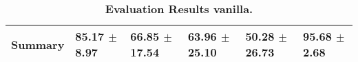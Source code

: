 \begin{table}[htb]
{\begin{tabular}{llllll}
\midrule
\textbf{Summary                                  } &        \phantom{0}85.17 $\pm$ \phantom{0}8.97 &                      \phantom{0}66.85 $\pm$ 17.54 &                  \phantom{0}63.96 $\pm$ 25.10 &            \phantom{0}50.28 $\pm$ 26.73 &  \phantom{0}95.68 $\pm$ \phantom{0}2.68 \\
\bottomrule
\end{tabular}%
}
\caption{\textbf{Evaluation Results vanilla.}}
\label{tab:eval-results}
\end{table}


